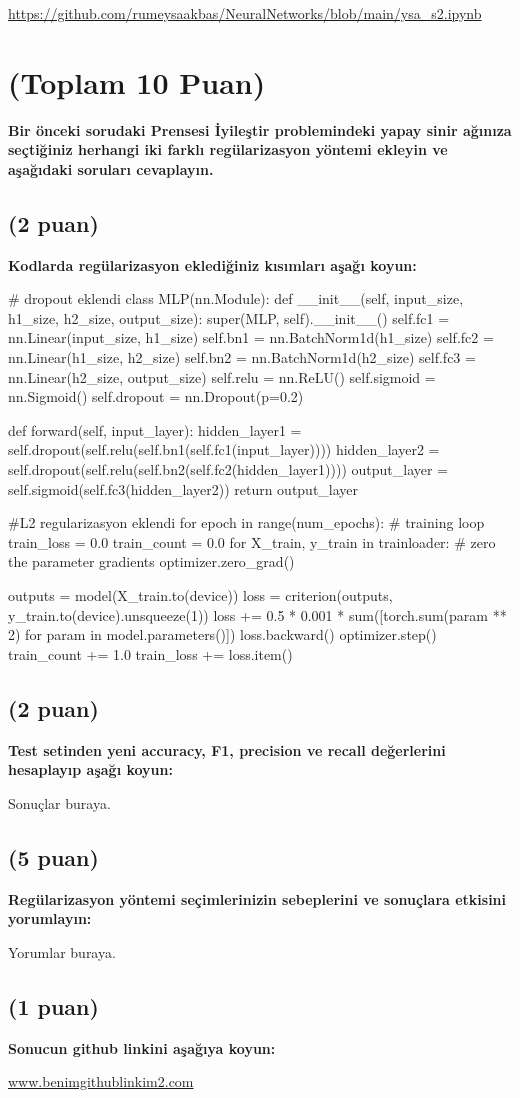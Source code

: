 \documentclass[11pt]{article}
\begin{document}
\url{https://github.com/rumeysaakbas/NeuralNetworks/blob/main/ysa_s2.ipynb}

\section{(Toplam 10 Puan)} \textbf{Bir önceki sorudaki Prensesi İyileştir problemindeki yapay sinir ağınıza seçtiğiniz herhangi iki farklı regülarizasyon yöntemi ekleyin ve aşağıdaki soruları cevaplayın.} 

\subsection{(2 puan)} \textbf{Kodlarda regülarizasyon eklediğiniz kısımları aşağı koyun:} 

\begin{python}
# dropout eklendi
class MLP(nn.Module):
    def __init__(self, input_size, h1_size, h2_size, output_size):
        super(MLP, self).__init__()
        self.fc1 = nn.Linear(input_size, h1_size)
        self.bn1 = nn.BatchNorm1d(h1_size)
        self.fc2 = nn.Linear(h1_size, h2_size)
        self.bn2 = nn.BatchNorm1d(h2_size)
        self.fc3 = nn.Linear(h2_size, output_size)
        self.relu = nn.ReLU()
        self.sigmoid = nn.Sigmoid()
        self.dropout = nn.Dropout(p=0.2)
        
    def forward(self, input_layer):
        hidden_layer1 = self.dropout(self.relu(self.bn1(self.fc1(input_layer))))
        hidden_layer2 = self.dropout(self.relu(self.bn2(self.fc2(hidden_layer1))))
        output_layer = self.sigmoid(self.fc3(hidden_layer2))
        return output_layer
\end{python}
\begin{python}
#L2 regularizasyon eklendi
for epoch in range(num_epochs):
    # training loop
    train_loss = 0.0
    train_count = 0.0
    for X_train, y_train in trainloader:
        # zero the parameter gradients
        optimizer.zero_grad()

        outputs = model(X_train.to(device))
        loss = criterion(outputs, y_train.to(device).unsqueeze(1))
        loss += 0.5 * 0.001 * sum([torch.sum(param ** 2) for param in model.parameters()])
        loss.backward()
        optimizer.step()
        train_count += 1.0
        train_loss += loss.item()
\end{python}

\subsection{(2 puan)} \textbf{Test setinden yeni accuracy, F1, precision ve recall değerlerini hesaplayıp aşağı koyun:}

Sonuçlar buraya.

\subsection{(5 puan)} \textbf{Regülarizasyon yöntemi seçimlerinizin sebeplerini ve sonuçlara etkisini yorumlayın:}

Yorumlar buraya.

\subsection{(1 puan)} \textbf{Sonucun github linkini  aşağıya koyun:}

\url{www.benimgithublinkim2.com}
\end{document}

